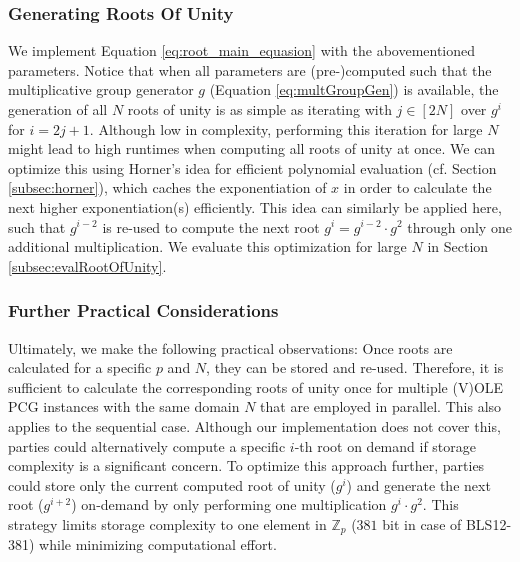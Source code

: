 \subsubsection{Generating Roots Of Unity}
We implement Equation \ref{eq:root_main_equasion} with the abovementioned parameters. Notice that when all parameters are (pre-)computed such that the multiplicative group generator $g$ (Equation \ref{eq:multGroupGen}) is available, the generation of all $N$ roots of unity is as simple as iterating with $j\in[2N]$ over $g^i$ for $i=2j+1$. Although low in complexity, performing this iteration for large $N$ might lead to high runtimes when computing all roots of unity at once. We can optimize this using Horner's idea for efficient polynomial evaluation (cf. Section \ref{subsec:horner}), which caches the exponentiation of $x$ in order to calculate the next higher exponentiation(s) efficiently. This idea can similarly be applied here, such that $g^{i-2}$ is re-used to compute the next root $g^i= g^{i-2}\cdot g^2$ through only one additional multiplication. We evaluate this optimization for large $N$ in Section \ref{subsec:evalRootOfUnity}.

\subsubsection{Further Practical Considerations}
Ultimately, we make the following practical observations: Once roots are calculated for a specific $p$ and $N$, they can be stored and re-used. Therefore, it is sufficient to calculate the corresponding roots of unity once for multiple (V)OLE PCG instances with the same domain $N$ that are employed in parallel. This also applies to the sequential case. Although our implementation does not cover this, parties could alternatively compute a specific $i$-th root on demand if storage complexity is a significant concern. To optimize this approach further, parties could store only the current computed root of unity ($g^i$) and generate the next root ($g^{i+2}$) on-demand by only performing one multiplication $g^i\cdot g^2$. This strategy limits storage complexity to one element in $\mathbb{Z}_p$ ($381$ bit in case of BLS12-381) while minimizing computational effort. 
